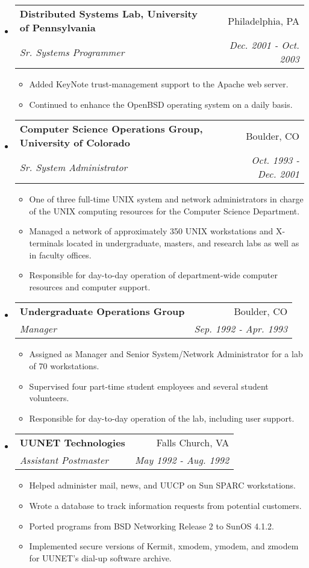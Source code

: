 \documentclass[letterpaper,11pt]{article}
\makeatletter
\newcommand{\resitem}[1]{\item #1 \vspace{-2pt}}
\newcommand{\ressubheading}[4]{
\begin{tabular*}{6.5in}{l@{\extracolsep{\fill}}r}
		\textbf{#1} & #2 \\
		\textit{#3} & \textit{#4} \\
\end{tabular*}\vspace{-6pt}}
\makeatother
\begin{document}
\begin{itemize}
\item
	\ressubheading{Distributed Systems Lab, University of Pennsylvania}{Philadelphia, PA}{Sr. Systems Programmer}{Dec. 2001 - Oct. 2003}
	\begin{itemize}
		\resitem{Added KeyNote trust-management support to the Apache web server.}
		\resitem{Continued to enhance the OpenBSD operating system on a daily basis.}
	\end{itemize}

\item
	\ressubheading{Computer Science Operations Group, University of Colorado}{Boulder, CO}{Sr. System Administrator}{Oct. 1993 - Dec. 2001}
	\begin{itemize}
		\resitem{One of three full-time {\sc UNIX} system and network administrators in charge of the {\sc UNIX} computing resources for the Computer Science Department.}
		\resitem{Managed a network of approximately 350 {\sc UNIX} workstations and X-terminals located in undergraduate, masters, and research labs as well as in faculty offices.}
		\resitem{Responsible for day-to-day operation of department-wide computer resources and computer support.}
	\end{itemize}

\pagebreak 

\item
	\ressubheading{Undergraduate Operations Group}{Boulder, CO}{Manager}{Sep. 1992 - Apr. 1993}
	\begin{itemize}
		\resitem{Assigned as Manager and Senior System/Network Administrator for a lab of 70 workstations.}
		\resitem{Supervised four part-time student employees and several student volunteers.}
		\resitem{Responsible for day-to-day operation of the lab, including user support.}
	\end{itemize}

\item
	\ressubheading{{\sc \bf UUNET} Technologies}{Falls Church, VA}{Assistant Postmaster}{May 1992 - Aug. 1992}
	\begin{itemize}
		\resitem{Helped administer mail, news, and {\sc UUCP} on Sun SPARC workstations.}
		\resitem{Wrote a database to track information requests from potential customers.}
		\resitem{Ported programs from BSD Networking Release 2 to SunOS 4.1.2.}
		\resitem{Implemented secure versions of Kermit, xmodem, ymodem, and zmodem for {\sc UUNET}'s dial-up software archive.}
	\end{itemize}


\end{itemize}
\end{document}
